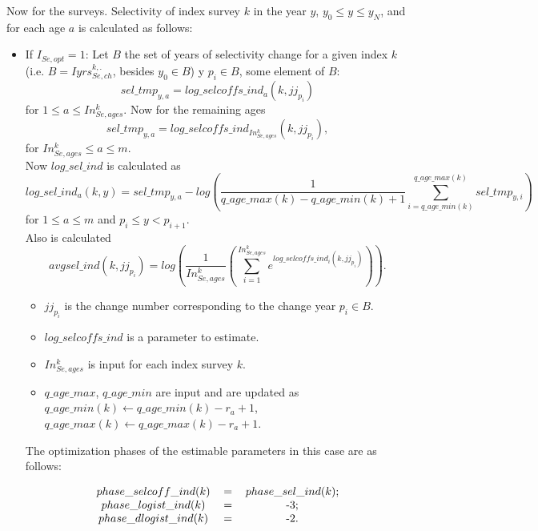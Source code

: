 \documentclass{article}
\begin{document}
Now for the surveys. Selectivity of index survey $k$ in the year $y$, $y_0\leq y \leq y_N$, and for each age $a$ is calculated as follows:\\
\begin{itemize}

\item If $I_{Se,opt}=1$:
Let $B$ the set of years of selectivity change for a given index $k$ (i.e. $B= Iyrs_{Se,ch}^{k,.}$, besides $y_0\in B$) y $p_i\in B$, some element of $B$:
\begin{equation}
    sel\_tmp_{y,a} = log\_selcoffs\_ind_a(k,jj_{p_i})
\end{equation}
for $1\leq a \leq In_{Se,ages}^k$.
Now for the remaining ages
\begin{equation}
    sel\_tmp_{y,a}= log\_selcoffs\_ind_{In_{Se,ages}^k}(k,jj_{p_i}),
\end{equation}
for $In_{Se,ages}^k\leq a \leq m$. \\

Now $log\_sel\_ind$ is calculated as
     \begin{equation}
        log\_sel\_ind_a(k,y)=sel\_tmp_{y,a}-log\left(\dfrac{1}{q\_age\_max(k)-q\_age\_min(k)+1}\sum_{i=q\_age\_min(k)}^{q\_age\_max(k)}sel\_tmp_{y,i}\right)
    \end{equation}
    for $1\leq a \leq m$ and $p_i\leq y < p_{i+1}$.\\
    Also is calculated
    \begin{equation}
        avgsel\_ind(k,jj_{p_i})=log\left(\dfrac{1}{In_{Se,ages}^k}\left( \sum_{i=1}^{In_{Se,ages}^k}e^{log\_selcoffs\_ind_i(k,jj_{p_i})}\right)\right).
    \end{equation}
    
\begin{itemize}    
    \item $jj_{p_i}$ is the change number corresponding to the change year  $p_i\in B$.
    \item $log\_selcoffs\_ind$ is a parameter to estimate.
     \item $In_{Se,ages}^k$ is input for each index survey $k$.
     \item $q\_age\_max$, $q\_age\_min$ are input and are updated as $q\_age\_min(k) \leftarrow  q\_age\_min(k) - r_a + 1$, $q\_age\_max(k) \leftarrow  q\_age\_max(k) - r_a + 1$.
\end{itemize}
The optimization phases of the estimable parameters in this case are as follows:
\begin{table}[H]
    \centering
    \begin{equation}
    \begin{tabular}{c c c}
        $phase\_selcoff\_ind(k)$ &= & $phase\_sel\_ind(k)$;\\
        $phase\_logist\_ind(k)$  &=& -3;\\
        $phase\_dlogist\_ind(k)$ &= &-2.
    \end{tabular}
    \end{equation}
    \label{tab: phase4}
\end{table}


\end{itemize}
\end{document}
